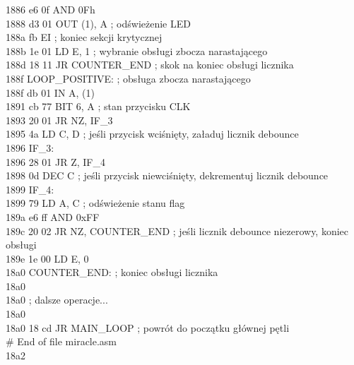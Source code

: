 \documentclass[a4paper,titlepage,11pt,floatssmall]{mwrep}
\begin{document}
\begin{flushleft}
1886 e6 0f				AND 0Fh \\
1888 d3 01				OUT (1), A	; odświeżenie LED \\
188a fb					EI			; koniec sekcji krytycznej \\
188b 1e 01				LD E, 1		; wybranie obsługi zbocza narastającego \\
188d 18 11				JR COUNTER\_END ; skok na koniec obsługi licznika \\
188f				LOOP\_POSITIVE:	; obsługa zbocza narastającego\\ 
188f db 01				IN A, (1) \\
1891 cb 77				BIT 6, A 	; stan przycisku CLK \\
1893 20 01				JR NZ, IF\_3 \\
1895 4a					LD C, D		; jeśli przycisk wciśnięty, załaduj licznik debounce \\
1896				IF\_3: \\
1896 28 01				JR Z, IF\_4 \\
1898 0d					DEC C		; jeśli przycisk niewciśnięty, dekrementuj licznik debounce \\
1899				IF\_4: \\
1899 79					LD A, C		; odświeżenie stanu flag \\
189a e6 ff				AND 0xFF \\
189c 20 02				JR NZ, COUNTER\_END ; jeśli licznik debounce niezerowy, koniec obsługi \\
189e 1e 00				LD E, 0 \\
18a0				COUNTER\_END:	; koniec obsługi licznika \\
18a0			 \\
18a0				; dalsze operacje...	 \\
18a0			 \\
18a0 18 cd		JR MAIN\_LOOP ; powrót do początku głównej pętli\\
\# End of file miracle.asm\\
18a2\\
\end{flushleft}
\end{document}
